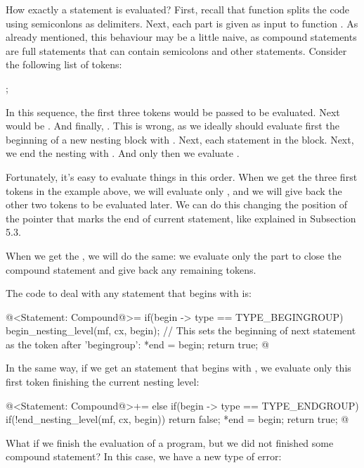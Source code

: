 How exactly a statement is evaluated? First, recall
that  function splits the code
using semiconlons as delimiters. Next, each part is given as input to
function . As already mentioned, this
behaviour may be a little naive, as compound statements are full
statements that can contain semicolons and other statements. Consider
the following list of tokens:

\alinhaverbatim
[begingroup][T1][T2][;][T3][T4][;][endgroup][;][T5];
\alinhanormal

In this sequence, the first three tokens would be passed to be
evaluated. Next would be \monoespaco{[T3][T4]}. And
finally, \monoespaco{[endgroup][T5]}. This is wrong, as we ideally
should evaluate first the beginning of a new nesting block
with \monoespaco{[begingroup]}. Next, each statement in the
block. Next, we end the nesting with \monoespaco{[endgroup]}. And only
then we evaluate \monoespaco{[T5]}.

Fortunately, it's easy to evaluate things in this order. When we get
the three first tokens in the example above, we will evaluate
only , and we will give back the other two
tokens to be evaluated later. We can do this changing the position of
the pointer that marks the end of current statement, like explained in
Subsection 5.3.

When we get the , we will do the same: we
evaluate only the  part to close the compound
statement and give back any remaining tokens.

The code to deal with any statement that begins
with  is:

\iniciocodigo
@<Statement: Compound@>=
if(begin -> type == TYPE_BEGINGROUP){
  begin_nesting_level(mf, cx, begin);
  // This sets the beginning of next statement as the token after 'begingroup':
  *end = begin;
  return true;
}
@
\fimcodigo

In the same way, if we get an statement that begins
with , we evaluate only this first token
finishing the current nesting level:

\iniciocodigo
@<Statement: Compound@>+=
else if(begin -> type == TYPE_ENDGROUP){
  if(!end_nesting_level(mf, cx, begin))
    return false;
  *end = begin;
  return true;
}
@
\fimcodigo

What if we finish the evaluation of a program, but we did not finished
some compound statement? In this case, we have a new type of error:


